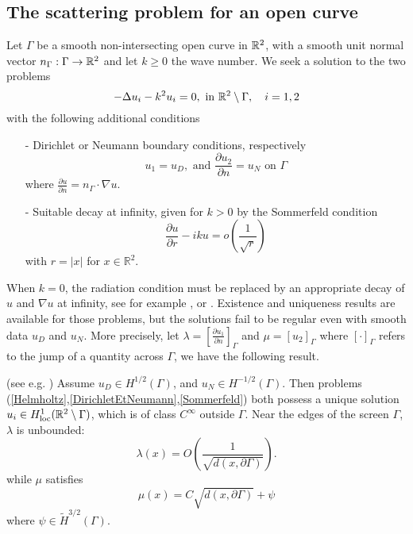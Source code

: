 \documentclass[a4paper]{article}
\begin{document}
\subsection{The scattering problem for an open curve}
\label{sec:scattering}
Let $\Gamma$ be a smooth non-intersecting open curve in $\mathbb{R}^2$, with a smooth unit normal vector $n_\Gamma : \Gamma \to \mathbb{R}^2$ and let $k \geq 0$ the wave number. We seek a solution to the two problems
\begin{equation}
-\Delta u_i - k^2 u_i = 0,  \text{ in } \mathbb{R}^2 \setminus \Gamma, \quad i = 1,2
\label{Helmholtz}
\end{equation}
with the following additional conditions
\begin{itemize}
	\item[-] Dirichlet or Neumann boundary conditions, respectively
	\begin{equation}
	u_1 = u_D, \text{ and  } \dfrac{\partial u_2}{\partial n} = u_N \text{ on } \Gamma
	\label{DirichletEtNeumann}
	\end{equation}
	where $\frac{\partial u}{\partial n} = n_\Gamma \cdot \nabla u$.
	\item[-] Suitable decay at infinity, given for $k > 0$ by the Sommerfeld condition
	\begin{equation}
	\dfrac{\partial u}{\partial r} - iku = o\left(\frac{1}{\sqrt{r}}\right)
	\label{Sommerfeld}
	\end{equation}
	with $r=|x|$ for $x\in \mathbb{R}^2$.
\end{itemize}
When $k=0$, the radiation condition must be replaced by an appropriate decay of $u$ and $\nabla u$ at infinity, see for example \cite{wendland1990hypersingular,stephan1984augmented}, or \cite[Chap. 7]{mclean2000strongly} . 
Existence and uniqueness results are available for those problems, but the solutions fail to be regular even with smooth data $u_D$ and $u_N$. More precisely,  let $\lambda = \left[\frac{\partial u_1}{\partial n}\right]_\Gamma$ and $\mu = \left[u_2\right]_\Gamma$ where $ \left[\cdot \right]_\Gamma$ refers to the jump of a quantity across $\Gamma$, we have the following result.
\begin{The}
	(see e.g. \cite{stephan1984augmented,wendland1990hypersingular,monch1996numerical}) Assume $u_D \in H^{1/2}(\Gamma)$, and $u_N \in H^{-1/2}(\Gamma)$. Then problems (\ref{Helmholtz},\ref{DirichletEtNeumann},\ref{Sommerfeld}) both possess a unique solution $u_i \in H^1_\textup{loc}(\mathbb{R}^2 \setminus \Gamma)$, which is of class $C^{\infty}$ outside $\Gamma$. Near the edges of the screen $\Gamma$, $\lambda$ is unbounded:
	\[\lambda(x)  = O\left(\frac{1}{\sqrt{d(x,\partial \Gamma)}}\right).\]
	while $\mu$ satisfies
	\[\mu(x) = C\sqrt{d(x,\partial \Gamma)} + \psi\]
	where $\psi \in \tilde{H}^{3/2}(\Gamma)$.
	\label{theScatt}
\end{The}
\end{document}
